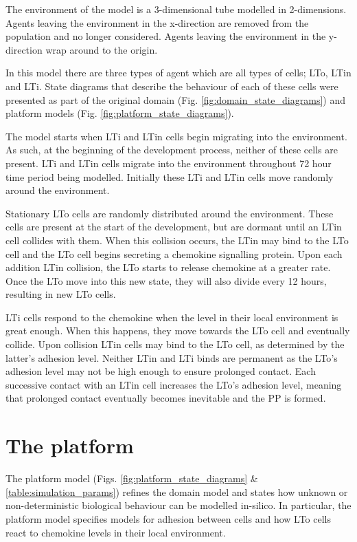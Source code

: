 \documentclass{UoYCSproject}
\begin{document}
The environment of the model is a 3-dimensional tube modelled in 2-dimensions.
Agents leaving the environment in the x-direction are removed from the population and no longer considered.
Agents leaving the environment in the y-direction wrap around to the origin.

In this model there are three types of agent which are all types of cells; \gls{LTo}, \gls{LTin} and \gls{LTi}.
State diagrams that describe the behaviour of each of these cells were presented as part of the original domain (Fig. \ref{fig:domain_state_diagrams}) and platform models (Fig. \ref{fig:platform_state_diagrams})\cite{kieran_thesis}.

The model starts when \gls{LTi} and \gls{LTin} cells begin migrating into the environment.
As such, at the beginning of the development process, neither of these cells are present.
\gls{LTi} and \gls{LTin} cells migrate into the environment throughout 72 hour time period being modelled.
Initially these \gls{LTi} and \gls{LTin} cells move randomly around the environment.

Stationary \gls{LTo} cells are randomly distributed around the environment.
These cells are present at the start of the development, but are dormant until an \gls{LTin} cell collides with them.
When this collision occurs, the \gls{LTin} may bind to the \gls{LTo} cell and the \gls{LTo} cell begins secreting a chemokine signalling protein.
Upon each addition \gls{LTin} collision, the \gls{LTo} starts to release chemokine at a greater rate.
Once the \gls{LTo} move into this new state, they will also divide every 12 hours, resulting in new \gls{LTo} cells.

\gls{LTi} cells respond to the chemokine when the level in their local environment is great enough.
When this happens, they move towards the \gls{LTo} cell and eventually collide.
Upon collision \gls{LTin} cells may bind to the \gls{LTo} cell, as determined by the latter's adhesion level.
Neither \gls{LTin} and \gls{LTi} binds are permanent as the \gls{LTo}'s adhesion level may not be high enough to ensure prolonged contact.
Each successive contact with an \gls{LTin} cell increases the \gls{LTo}'s adhesion level, meaning that prolonged contact eventually becomes inevitable and the \gls{PP} is formed.

\section{The \gls{platform}}
The platform model (Figs. \ref{fig:platform_state_diagrams} \& \ref{table:simulation_params}) refines the domain model and states how unknown or non-deterministic biological behaviour can be modelled \gls{in-silico}.
In particular, the platform model specifies models for adhesion between cells and how \gls{LTo} cells react to chemokine levels in their local environment\cite{kieran_thesis, kieran_methodology}.
\end{document}
